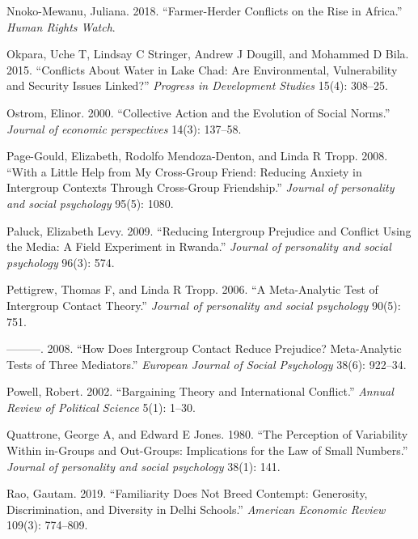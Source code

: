 \documentclass[11pt]{article}
\begin{document}
\leavevmode\hypertarget{ref-hrc2018farmer}{}%
Nnoko-Mewanu, Juliana. 2018. ``Farmer-Herder Conflicts on the Rise in
Africa.'' \emph{Human Rights Watch}.

\leavevmode\hypertarget{ref-okpara2015conflicts}{}%
Okpara, Uche T, Lindsay C Stringer, Andrew J Dougill, and Mohammed D
Bila. 2015. ``Conflicts About Water in Lake Chad: Are Environmental,
Vulnerability and Security Issues Linked?'' \emph{Progress in
Development Studies} 15(4): 308--25.

\leavevmode\hypertarget{ref-ostrom2000collective}{}%
Ostrom, Elinor. 2000. ``Collective Action and the Evolution of Social
Norms.'' \emph{Journal of economic perspectives} 14(3): 137--58.

\leavevmode\hypertarget{ref-page2008little}{}%
Page-Gould, Elizabeth, Rodolfo Mendoza-Denton, and Linda R Tropp. 2008.
``With a Little Help from My Cross-Group Friend: Reducing Anxiety in
Intergroup Contexts Through Cross-Group Friendship.'' \emph{Journal of
personality and social psychology} 95(5): 1080.

\leavevmode\hypertarget{ref-paluck2009jsp}{}%
Paluck, Elizabeth Levy. 2009. ``Reducing Intergroup Prejudice and
Conflict Using the Media: A Field Experiment in Rwanda.'' \emph{Journal
of personality and social psychology} 96(3): 574.

\leavevmode\hypertarget{ref-pettigrew2006meta}{}%
Pettigrew, Thomas F, and Linda R Tropp. 2006. ``A Meta-Analytic Test of
Intergroup Contact Theory.'' \emph{Journal of personality and social
psychology} 90(5): 751.

\leavevmode\hypertarget{ref-pettigrew2008does}{}%
---------. 2008. ``How Does Intergroup Contact Reduce Prejudice?
Meta-Analytic Tests of Three Mediators.'' \emph{European Journal of
Social Psychology} 38(6): 922--34.

\leavevmode\hypertarget{ref-powell2002bargaining}{}%
Powell, Robert. 2002. ``Bargaining Theory and International Conflict.''
\emph{Annual Review of Political Science} 5(1): 1--30.

\leavevmode\hypertarget{ref-quattrone1980perception}{}%
Quattrone, George A, and Edward E Jones. 1980. ``The Perception of
Variability Within in-Groups and Out-Groups: Implications for the Law of
Small Numbers.'' \emph{Journal of personality and social psychology}
38(1): 141.

\leavevmode\hypertarget{ref-rao2019familiarity}{}%
Rao, Gautam. 2019. ``Familiarity Does Not Breed Contempt: Generosity,
Discrimination, and Diversity in Delhi Schools.'' \emph{American
Economic Review} 109(3): 774--809.
\end{document}
